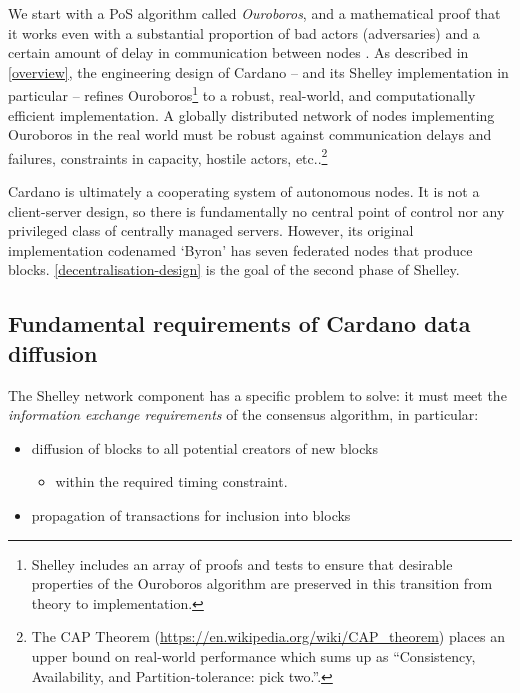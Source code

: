\documentclass[11pt,a4paper]{article}
\begin{document}
We start with a PoS algorithm called \emph{Ouroboros}, and a
mathematical proof that it works even with a substantial proportion of
bad actors (adversaries) and a certain amount of delay in communication
between nodes \cite{BGKR17}. As described in
\cref{overview}, the engineering design of
Cardano -- and its Shelley implementation in particular -- refines
Ouroboros\footnote{Shelley includes an array of proofs and tests to
  ensure that desirable properties of the Ouroboros algorithm are
  preserved in this transition from theory to implementation.} to a
robust, real-world, and computationally efficient implementation. A
globally distributed network of nodes implementing Ouroboros in the real
world must be robust against communication delays and failures,
constraints in capacity, hostile actors, etc..\footnote{The CAP Theorem
  (\href{https://en.wikipedia.org/wiki/CAP_theorem}{{https://en.wikipedia.org/wiki/CAP\_theorem}})
  places an upper bound on real-world performance which sums up as
  ``Consistency, Availability, and Partition-tolerance: pick two.''.}

Cardano is ultimately a cooperating system of autonomous nodes. It is
not a client-server design, so there is fundamentally no central point
of control nor any privileged class of centrally managed servers.
However, its original implementation codenamed `Byron' has seven
federated nodes that produce blocks.
\cref{decentralisation-design} is
the goal of the second phase of Shelley.

\subsection{Fundamental requirements of Cardano data diffusion}
\label{fundamental-requirements-of-cardano-data-diffusion}

The Shelley network component has a specific problem to solve: it must
meet the \emph{information exchange requirements} of the consensus
algorithm, in particular:

\begin{itemize}
\item
  diffusion of blocks to all potential creators of new blocks

  \begin{itemize}
  \item
    within the required timing constraint.
  \end{itemize}
\item
  propagation of transactions for inclusion into blocks
\end{itemize}
\end{document}
